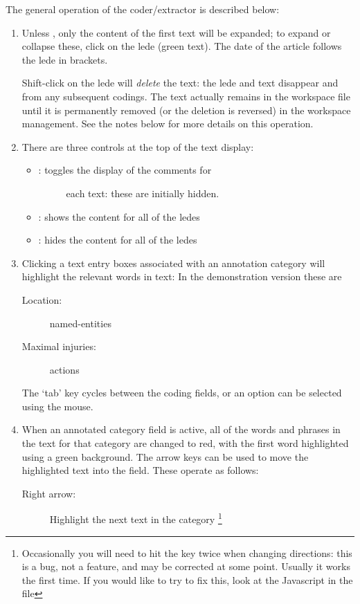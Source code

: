 \documentclass[letterpaper,10pt,english]{sphinxmanual}
\begin{document}
The general operation of the coder/extractor is described below:
\begin{enumerate}
\item {} 
Unless , only the content
of the first text will be expanded; to expand or collapse these,
click on the lede (green text). The date of the
article follows the lede in brackets.

Shift-click on the lede will \emph{delete} the text: the lede and text
disappear and from any subsequent codings. The text actually remains
in the workspace file until it is permanently removed (or the
deletion is reversed) in the workspace management. See the notes
below for more details on this operation.

\item {} 
There are three controls at the top of the text display:
\begin{itemize}
\item {} \begin{description}
\item[{: toggles the display of the comments for}] \leavevmode
each text: these are initially hidden.

\end{description}

\item {} 
: shows the content for all of the ledes

\item {} 
: hides the content for all of the ledes

\end{itemize}

\item {} 
Clicking a text entry boxes associated with an annotation category
will highlight the relevant words in text: In the demonstration
version these are
\begin{description}
\item[{Location:}] \leavevmode
named-entities

\item[{Maximal injuries:}] \leavevmode
actions

\end{description}

The ‘tab’ key cycles between the coding fields, or an option can be
selected using the mouse.

\item {} 
When an annotated category field is active, all of the words and
phrases in the text for that category are changed to red, with the
first word highlighted using a green background. The arrow keys can
be used to move the highlighted text into the field. These operate as
follows:
\begin{description}
\item[{Right arrow:}] \leavevmode
Highlight the next text in the category \footnote{
Occasionally you will need to hit the key twice when changing
directions: this is a bug, not a feature, and may be corrected at
some point. Usually it works the first time. If you would like to try
to fix this, look at the Javascript in the file 
}


\end{description}
\end{enumerate}
\end{document}
